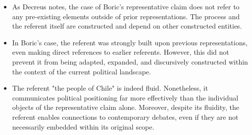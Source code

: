 \begin{itemize}
	\item As Decreus notes, the case of Boric's representative claim does not refer to any pre-existing elements outside of prior representations. The process and the referent itself are constructed and depend on other constructed entities.
	\item In Boric's case, the referent was strongly built upon previous representations, even making direct references to earlier referents. However, this did not prevent it from being adapted, expanded, and discursively constructed within the context of the current political landscape.
	\item The referent "the people of Chile" is indeed fluid. Nonetheless, it communicates political positioning far more effectively than the individual objects of the representative claim alone. Moreover, despite its fluidity, the referent enables connections to contemporary debates, even if they are not necessarily embedded within its original scope.
\end{itemize}

\printbibliography









































